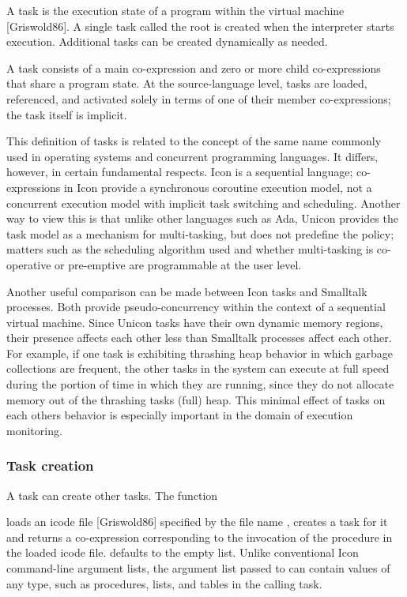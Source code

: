 A task is the execution state of a program within the virtual machine
[Griswold86]. A single task called the root is created when the
interpreter starts execution. Additional tasks can be created
dynamically as needed.

A task consists of a main co-expression and zero or more child
co-expressions that share a program state. At the source-language
level, tasks are loaded, referenced, and activated solely in terms of
one of their member co-expressions; the task itself is
implicit.

This definition of tasks is related to the concept of the same name
commonly used in operating systems and concurrent programming
languages. It differs, however, in certain fundamental respects. Icon
is a sequential language; co-expressions in Icon provide a synchronous
coroutine execution model, not a concurrent execution model with
implicit task switching and scheduling. Another way to view this is
that unlike other languages such as Ada, Unicon provides the task model
as a mechanism for multi-tasking, but does not predefine the policy;
matters such as the scheduling algorithm used and whether multi-tasking
is co-operative or pre-emptive are programmable at the user
level.

Another useful comparison can be made between Icon tasks and Smalltalk
processes. Both provide pseudo-concurrency within the context of a
sequential virtual machine. Since Unicon tasks have their own dynamic
memory regions, their presence affects each other less than Smalltalk
processes affect each other. For example, if one task is exhibiting
thrashing heap behavior in which garbage collections are frequent, the
other tasks in the system can execute at full speed during the portion
of time in which they are running, since they do not allocate memory
out of the thrashing task{\textquotesingle}s (full) heap. This minimal
effect of tasks on each others{\textquotesingle} behavior is especially
important in the domain of execution monitoring. 

\subsubsection{Task creation}

A task can create other tasks. The function 


\noindent loads an icode file [Griswold86] specified by the file name
, creates a task for it and returns a
co-expression corresponding to the invocation of the procedure
 in the loaded icode file.
\textstyleSourceText{ }defaults to the
empty list. Unlike conventional Icon command-line argument lists, the
argument list passed to\textstyleSourceText{
} can contain values of any type,
such as procedures, lists, and tables in the calling task.

